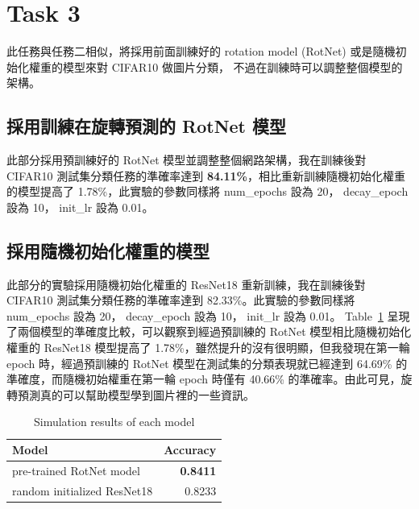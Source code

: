 \documentclass[a4paper,12pt]{article}   %
\begin{document}
\section{Task 3}
	
	此任務與任務二相似，將採用前面訓練好的 rotation model (RotNet) 或是隨機初始化權重的模型來對 CIFAR10 做圖片分類， 不過在訓練時可以調整整個模型的架構。
	
\subsection{採用訓練在旋轉預測的 RotNet 模型}
	此部分採用預訓練好的 RotNet 模型並調整整個網路架構，我在訓練後對 CIFAR10 測試集分類任務的準確率達到 \textbf{84.11\%}，相比重新訓練隨機初始化權重的模型提高了 1.78\%，此實驗的參數同樣將 num\_epochs 設為 20， decay\_epoch 設為 10， init\_lr 設為 0.01。


\subsection{採用隨機初始化權重的模型}
	此部分的實驗採用隨機初始化權重的 ResNet18 重新訓練，我在訓練後對 CIFAR10 測試集分類任務的準確率達到 82.33\%。此實驗的參數同樣將 num\_epochs 設為 20， decay\_epoch 設為 10， init\_lr 設為 0.01。 Table\ \ref{table:comparison2} 呈現了兩個模型的準確度比較，可以觀察到經過預訓練的 RotNet 模型相比隨機初始化權重的 ResNet18 模型提高了 1.78\%，雖然提升的沒有很明顯，但我發現在第一輪 epoch 時，經過預訓練的 RotNet 模型在測試集的分類表現就已經達到 64.69\% 的準確度，而隨機初始權重在第一輪 epoch 時僅有 40.66\% 的準確率。由此可見，旋轉預測真的可以幫助模型學到圖片裡的一些資訊。 


\begin{table}[htb]
	\centering	
	\normalsize
    \newcommand{\z}{\phantom{0}}
    \caption{Simulation results of each model}
    \vspace{0.15\baselineskip}
	\begin{tabularx}{0.6\textwidth}{@{}lr@{}}\toprule
		\textbf{Model} & \textbf{Accuracy} \\
		\hline
		pre-trained RotNet model & \textbf{0.8411}  \\ 
		random initialized ResNet18   & 0.8233  \\
    		\hline

	\end{tabularx}
	\label{table:comparison2}
   \vspace{0.15\baselineskip}
\end{table}
\end{document}
